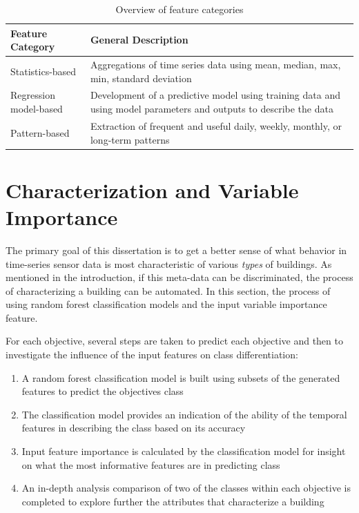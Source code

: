 \begin{table} 
    \begin{tabular}{| p{8cm} | p{6cm}  |}
        \hline
        \textbf{Feature Category} &  \textbf{General Description}\\ 
        \hline
        Statistics-based & Aggregations of time series data using mean, median, max, min, standard deviation \\ 
        \hline
        Regression model-based & Development of a predictive model using training data and using model parameters and outputs to describe the data \\ 
        \hline
        Pattern-based &  Extraction of frequent and useful daily, weekly, monthly, or long-term patterns\\ 
        \hline
    \end{tabular} 
    \caption{Overview of feature categories}
\end{table}
\label{tab:featureoverview}

\section{Characterization and Variable Importance}
\label{sec:variableimportance}

The primary goal of this dissertation is to get a better sense of what behavior in time-series sensor data is most characteristic of various \emph{types} of buildings. As mentioned in the introduction, if this meta-data can be discriminated, the process of characterizing a building can be automated. In this section, the process of using random forest classification models and the input variable importance feature.

For each objective, several steps are taken to predict each objective and then to investigate the influence of the input features on class differentiation:
\begin{enumerate}
\item A random forest classification model is built using subsets of the generated features to predict the objectives class
\item The classification model provides an indication of the ability of the temporal features in describing the class based on its accuracy
\item Input feature importance is calculated by the classification model for insight on what the most informative features are in predicting class
\item An in-depth analysis comparison of two of the classes within each objective is completed to explore further the attributes that characterize a building
\end{enumerate}

